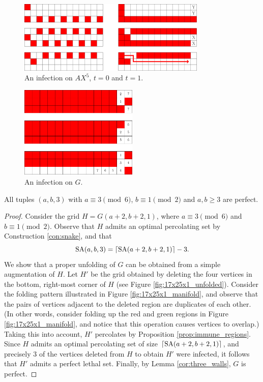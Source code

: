 \begin{figure}[]
\centering
\includegraphics[width=0.8\textwidth]{figures/7/3x13x3.pdf}
\caption{An infection on $AX^5$, $t=0$ and $t=1$.}
\label{fig:3x13x3}
\end{figure} 

\begin{figure}[]
\centering
\includegraphics[width=0.5\textwidth]{figures/7/3x14x3_numbered_heatmap.pdf}
\caption{An infection on $G$.}
\label{fig:3x14x3}
\end{figure} 

\begin{con}
\label{con:3xaxb}
All tuples $(a,b,3)$ with $a \equiv 3 \pmod 6$, $b \equiv 1 \pmod 2$ and $a,b \geq 3$ are perfect. 
\end{con}

\begin{proof}
Consider the grid $H=G(a+2,b+2,1)$, where $a \equiv 3 \pmod 6$ and $b \equiv 1 \pmod 2$. Observe that $H$ admits an optimal percolating set by Construction \ref{con:snake}, and that
$$\text{SA}(a,b,3) = \lceil\text{SA}(a+2,b+2,1)\rceil - 3.$$
We show that a proper unfolding of $G$ can be obtained from a simple augmentation of $H$. Let $H'$ be the grid obtained by deleting the four vertices in the bottom, right-most corner of $H$ (see Figure \ref{fig:17x25x1_unfolded}). Consider the folding pattern illustrated in Figure \ref{fig:17x25x1_manifold}, and observe that the pairs of vertices adjacent to the deleted region are duplicates of each other. (In other words, consider folding up the red and green regions in Figure \ref{fig:17x25x1_manifold}, and notice that this operation causes vertices to overlap.) Taking this into account, $H'$ percolates by Proposition \ref{prop:immune_regions}. Since $H$ admits an optimal percolating set of size $\lceil\text{SA}(a+2,b+2,1)\rceil$, and precisely 3 of the vertices deleted from $H$ to obtain $H'$ were infected, it follows that $H'$ admits a perfect lethal set. Finally, by Lemma \ref{cor:three_walls}, $G$ is perfect.
\end{proof}

